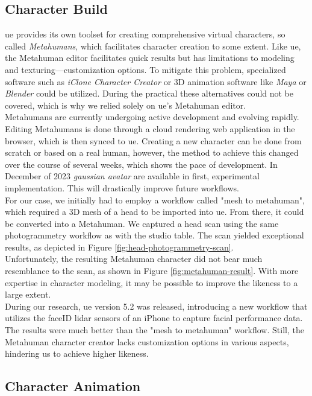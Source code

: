 \documentclass[
  a4paper,  %
  twoside,  %
  bibliography=totoc,
  headsepline,
  cleardoublepage=empty,
  parskip=half,
  draft=false
]{scrbook}
\begin{document}
\subsection*{Character Build}
\gls{ue} provides its own toolset for creating comprehensive virtual characters, so called \textit{Metahumans}, which facilitates character creation to some extent. Like \gls{ue}, the Metahuman editor facilitates quick results but has limitations to modeling and texturing—customization options. To mitigate this problem, specialized software such as \textit{iClone Character Creator} or 3D animation software like \textit{Maya} or \textit{Blender} could be utilized. During the practical these alternatives could not be covered, which is why we relied solely on \gls{ue}'s Metahuman editor. \\
Metahumans are currently undergoing active development and evolving rapidly. Editing Metahumans is done through a cloud rendering web application in the browser, which is then synced to \gls{ue}. Creating a new character can be done from scratch or based on a real human, however, the method to achieve this changed over the course of several weeks, which shows the pace of development. In December of 2023 \textit{gaussian avatar} are available in first, experimental implementation. This will drastically improve future workflows. \\
For our case, we initially had to employ a workflow called "mesh to metahuman", which required a 3D mesh of a head to be imported into \gls{ue}. From there, it could be converted into a Metahuman. We captured a head scan using the same photogrammetry workflow as with the studio table. The scan yielded exceptional results, as depicted in Figure \ref{fig:head-photogrammetry-scan}. \\
Unfortunately, the resulting Metahuman character did not bear much resemblance to the scan, as shown in Figure \ref{fig:metahuman-result}. With more expertise in character modeling, it may be possible to improve the likeness to a large extent. \\
During our research, \gls{ue} version 5.2 was released, introducing a new workflow that utilizes the faceID lidar sensors of an iPhone to capture facial performance data. The results were much better than the "mesh to metahuman" workflow. Still, the Metahuman character creator lacks customization options in various aspects, hindering us to achieve higher likeness.

\subsection*{Character Animation}
\end{document}
